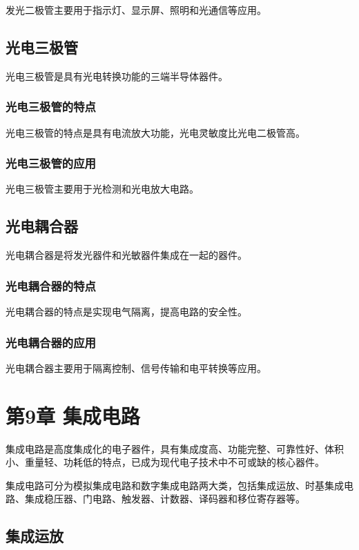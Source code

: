 \documentclass[12pt,UTF8]{ctexbook}
\begin{document}
发光二极管主要用于指示灯、显示屏、照明和光通信等应用。

\section{光电三极管}

光电三极管是具有光电转换功能的三端半导体器件。

\subsection{光电三极管的特点}

光电三极管的特点是具有电流放大功能，光电灵敏度比光电二极管高。

\subsection{光电三极管的应用}

光电三极管主要用于光检测和光电放大电路。

\section{光电耦合器}

光电耦合器是将发光器件和光敏器件集成在一起的器件。

\subsection{光电耦合器的特点}

光电耦合器的特点是实现电气隔离，提高电路的安全性。

\subsection{光电耦合器的应用}

光电耦合器主要用于隔离控制、信号传输和电平转换等应用。

\chapter{第9章 集成电路}

集成电路是高度集成化的电子器件，具有集成度高、功能完整、可靠性好、体积小、重量轻、功耗低的特点，已成为现代电子技术中不可或缺的核心器件。

集成电路可分为模拟集成电路和数字集成电路两大类，包括集成运放、时基集成电路、集成稳压器、门电路、触发器、计数器、译码器和移位寄存器等。

\section{集成运放}
\end{document}
